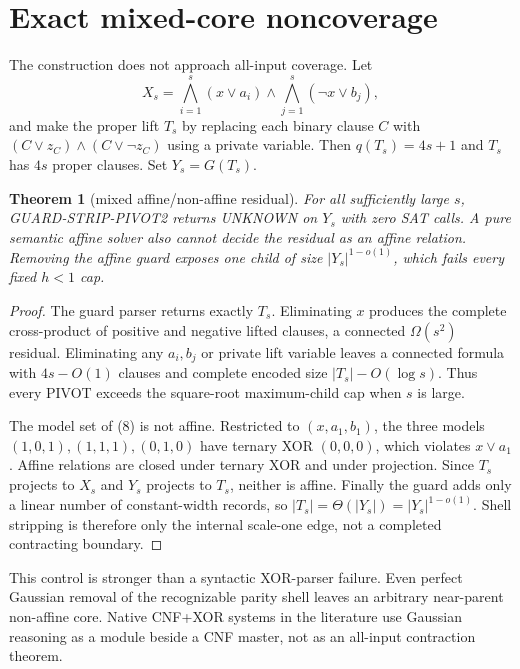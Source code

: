 \documentclass[11pt]{article}
\newtheorem{theorem}{Theorem}
\begin{document}
\section{Exact mixed-core noncoverage}
The construction does not approach all-input coverage.  Let
\begin{equation}
 X_s=\bigwedge_{i=1}^s(x\vee a_i)\wedge
     \bigwedge_{j=1}^s(\neg x\vee b_j),                  \tag{8}
\end{equation}
and make the proper lift $T_s$ by replacing each binary clause $C$ with
$(C\vee z_C)\wedge(C\vee\neg z_C)$ using a private variable.  Then
$q(T_s)=4s+1$ and $T_s$ has $4s$ proper clauses.  Set $Y_s=G(T_s)$.

\begin{theorem}[mixed affine/non-affine residual]\label{thm:miss}
For all sufficiently large $s$, \textsc{GUARD-STRIP-PIVOT2} returns UNKNOWN
on $Y_s$ with zero SAT calls.  A pure semantic affine solver also cannot
decide the residual as an affine relation.  Removing the affine guard exposes
one child of size $|Y_s|^{1-o(1)}$, which fails every fixed $h<1$ cap.
\end{theorem}
\begin{proof}
The guard parser returns exactly $T_s$.  Eliminating $x$ produces the complete
cross-product of positive and negative lifted clauses, a connected
$\Omega(s^2)$ residual.  Eliminating any $a_i,b_j$ or private lift variable
leaves a connected formula with $4s-O(1)$ clauses and complete encoded size
$|T_s|-O(\log s)$.  Thus every PIVOT exceeds the square-root maximum-child
cap when $s$ is large.

The model set of (8) is not affine.  Restricted to $(x,a_1,b_1)$, the three
models $(1,0,1),(1,1,1),(0,1,0)$ have ternary XOR $(0,0,0)$, which violates
$x\vee a_1$.  Affine relations are closed under ternary XOR and under
projection.  Since $T_s$ projects to $X_s$ and $Y_s$ projects to $T_s$,
neither is affine.  Finally the guard adds only a linear number of
constant-width records, so $|T_s|=\Theta(|Y_s|)=|Y_s|^{1-o(1)}$.  Shell
stripping is therefore only the internal scale-one edge, not a completed
contracting boundary.
\end{proof}

This control is stronger than a syntactic XOR-parser failure.  Even perfect
Gaussian removal of the recognizable parity shell leaves an arbitrary
near-parent non-affine core.  Native CNF+XOR systems in the literature use
Gaussian reasoning as a module beside a CNF master, not as an all-input
contraction theorem.
\end{document}
